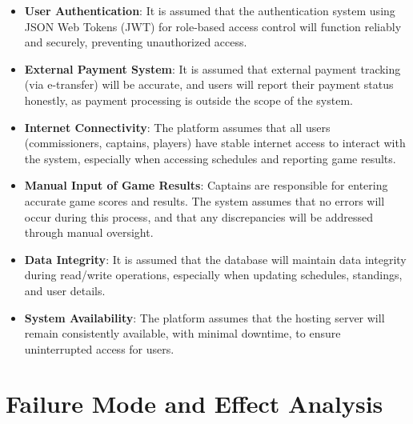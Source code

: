 \documentclass{article}
\begin{document}
\begin{itemize}
    \item \textbf{User Authentication}: It is assumed that the authentication system using JSON Web Tokens (JWT) for role-based access control will function reliably and securely, preventing unauthorized access.
    \item \textbf{External Payment System}: It is assumed that external payment tracking (via e-transfer) will be accurate, and users will report their payment status honestly, as payment processing is outside the scope of the system.
    \item \textbf{Internet Connectivity}: The platform assumes that all users (commissioners, captains, players) have stable internet access to interact with the system, especially when accessing schedules and reporting game results.
    \item \textbf{Manual Input of Game Results}: Captains are responsible for entering accurate game scores and results. The system assumes that no errors will occur during this process, and that any discrepancies will be addressed through manual oversight.
    \item \textbf{Data Integrity}: It is assumed that the database will maintain data integrity during read/write operations, especially when updating schedules, standings, and user details.
    \item \textbf{System Availability}: The platform assumes that the hosting server will remain consistently available, with minimal downtime, to ensure uninterrupted access for users.
\end{itemize}

\section{Failure Mode and Effect Analysis}
\end{document}
